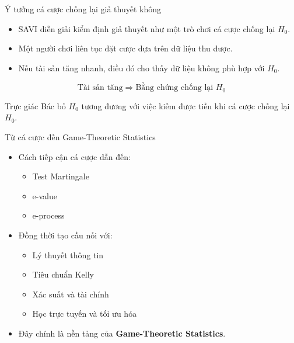 \begin{frame}{Ý tưởng cá cược chống lại giả thuyết không}

\begin{itemize}

    \item SAVI diễn giải kiểm định giả thuyết như một trò chơi cá cược chống lại $H_0$.

    \item Một người chơi liên tục đặt cược dựa trên dữ liệu thu được.

    \item Nếu tài sản tăng nhanh, điều đó cho thấy dữ liệu không phù hợp với $H_0$.

\end{itemize}

\medskip

\[
\text{Tài sản tăng}
\Longrightarrow
\text{Bằng chứng chống lại } H_0
\]

\medskip

\begin{block}{Trực giác}
Bác bỏ $H_0$ tương đương với việc kiếm được tiền khi cá cược chống lại $H_0$.
\end{block}

\end{frame}

\begin{frame}{Từ cá cược đến Game-Theoretic Statistics}

\begin{itemize}

\item Cách tiếp cận cá cược dẫn đến:
\begin{itemize}
    \item Test Martingale
    \item e-value
    \item e-process
\end{itemize}

\item Đồng thời tạo cầu nối với:
\begin{itemize}
    \item Lý thuyết thông tin
    \item Tiêu chuẩn Kelly
    \item Xác suất và tài chính
    \item Học trực tuyến và tối ưu hóa
\end{itemize}

\item Đây chính là nền tảng của \textbf{Game-Theoretic Statistics}.

\end{itemize}

\end{frame}

